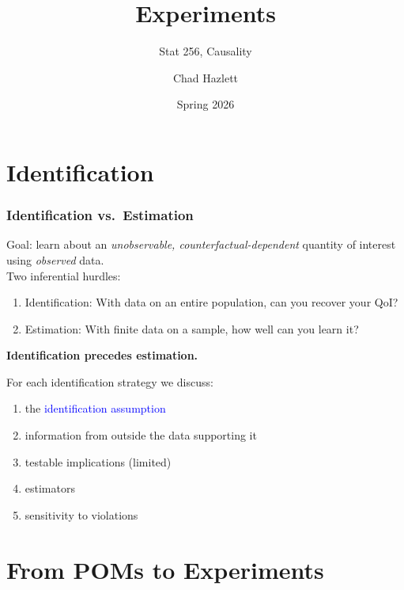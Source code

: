 \documentclass[xcolor=dvipsnames]{beamer}
\title[]{Experiments}
\subtitle[ ]{Stat 256, Causality}
\date{Spring 2026}
\author[Hazlett]{Chad Hazlett }
\institute[UCLA]{UCLA\\[1ex]
  \texttt{chazlett@ucla.edu}
}
\begin{document}
\begin{frame}
  \titlepage
\end{frame}


\section{Identification}

\begin{frame}
  \frametitle{Identification vs.\ Estimation}
  \small
Goal: learn about an \textit{unobservable, counterfactual-dependent} quantity of interest using \textit{observed} data.\\

\pause
\medskip
Two inferential hurdles:
\begin{enumerate}
\item \alert{Identification}: With data on an entire population, can you recover your QoI?
\item \alert{Estimation}: With finite data on a sample, how well can you learn it?
\end{enumerate}
\pause
\begin{center}
\textbf{Identification precedes estimation.}
\end{center}

\pause
\medskip
For each identification strategy we discuss:
\footnotesize
\begin{enumerate}
\item the \textcolor{Blue}{identification assumption}
\item information from outside the data supporting it
\item testable implications (limited)
\item estimators
\item sensitivity to violations
\end{enumerate}
\end{frame}


\section{From POMs to Experiments}
\end{document}
